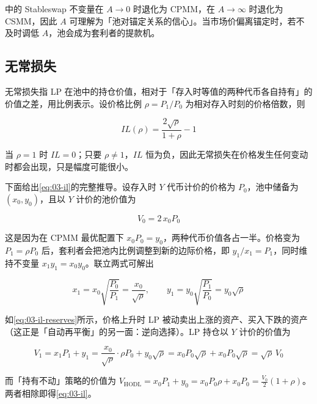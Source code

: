 中的 Stableswap 不变量在 $A\to 0$ 时退化为 CPMM，在 $A\to\infty$ 时退化为 CSMM，因此 $A$ 可理解为「池对锚定关系的信心」。当市场价偏离锚定时，若不及时调低 $A$，池会成为套利者的提款机。

\subsection{无常损失}

\begin{definition}\label{def:03-il}
无常损失指 LP 在池中的持仓价值，相对于「存入时等值的两种代币各自持有」的价值之差，用比例表示。设价格比例 $\rho = P_1/P_0$ 为相对存入时刻的价格倍数，则

\begin{equation}
  IL(\rho) = \frac{2\sqrt{\rho}}{1+\rho} - 1
  \label{eq:03-il}
\end{equation}

当 $\rho = 1$ 时 $IL = 0$；只要 $\rho\neq 1$，$IL$ 恒为负，因此无常损失在价格发生任何变动时都会出现，只是幅度可能很小。
\end{definition}

下面给出\cref{eq:03-il}的完整推导。设存入时 $Y$ 代币计价的价格为 $P_0$，池中储备为 $(x_0,y_0)$，且以 $Y$ 计价的池价值为

\begin{equation}
  V_0 = 2\,x_0 P_0
  \label{eq:03-v0}
\end{equation}

这是因为在 CPMM 最优配置下 $x_0P_0 = y_0$，两种代币价值各占一半。价格变为 $P_1 = \rho P_0$ 后，套利者会把池内比例调整到新的边际价格，即 $y_1/x_1 = P_1$，同时维持不变量 $x_1y_1 = x_0y_0$。联立两式可解出

\begin{equation}
  x_1 = x_0\sqrt{\frac{P_0}{P_1}} = \frac{x_0}{\sqrt{\rho}},
  \qquad
  y_1 = y_0\sqrt{\frac{P_1}{P_0}} = y_0\sqrt{\rho}
  \label{eq:03-il-reserves}
\end{equation}

如\cref{eq:03-il-reserves}所示，价格上升时 LP 被动卖出上涨的资产、买入下跌的资产（这正是「自动再平衡」的另一面：逆向选择）。LP 持仓以 $Y$ 计价的价值为

\begin{equation}
  V_1 = x_1P_1 + y_1 = \frac{x_0}{\sqrt{\rho}}\cdot\rho P_0 + y_0\sqrt{\rho}
      = x_0P_0\sqrt{\rho} + x_0P_0\sqrt{\rho} = \sqrt{\rho}\,V_0
  \label{eq:03-v1}
\end{equation}

而「持有不动」策略的价值为 $V_{\text{HODL}} = x_0P_1 + y_0 = x_0P_0\rho + x_0P_0 = \tfrac{V_0}{2}(1+\rho)$。两者相除即得\cref{eq:03-il}。


